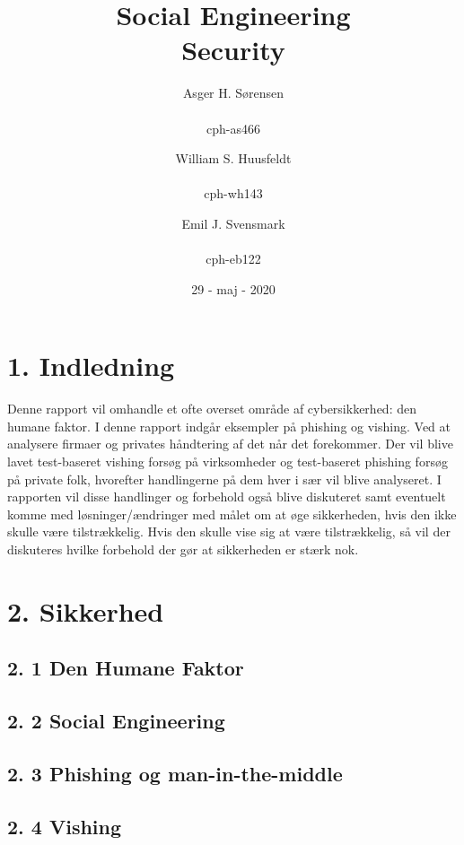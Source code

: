 \documentclass[11pt]{report}
\title{Social Engineering\\Security}
\author{
Asger H. Sørensen\\
\\cph-as466
\and
William S. Huusfeldt\\
\\cph-wh143
\and
Emil J. Svensmark\\
\\cph-eb122
}
\date{29 - maj - 2020}
\begin{document}
\maketitle
\renewcommand{\cftchapleader}{\cftdotfill{\cftdotsep}}
\tableofcontents
\newpage

\chapter*{1. Indledning}
Denne rapport vil omhandle et ofte overset område af cybersikkerhed: den humane faktor. I denne rapport indgår eksempler på phishing og vishing. Ved at analysere firmaer og privates håndtering af det når det forekommer. Der vil blive lavet test-baseret vishing forsøg på virksomheder og test-baseret phishing forsøg på private folk, hvorefter handlingerne på dem hver i sær vil blive analyseret. I rapporten vil disse handlinger og forbehold også blive diskuteret samt eventuelt komme med løsninger/ændringer med målet om at øge sikkerheden, hvis den ikke skulle være tilstrækkelig. Hvis den skulle vise sig at være tilstrækkelig, så vil der diskuteres hvilke forbehold der gør at sikkerheden er stærk nok. 

\chapter*{2. Sikkerhed}

\section*{2. 1 Den Humane Faktor}

\section*{2. 2 Social Engineering}

\section*{2. 3 Phishing og man-in-the-middle}

\section*{2. 4 Vishing}
\end{document}
